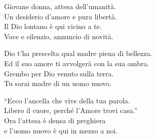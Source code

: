 
\strofa Giovane donna, attesa dell'umanità.\\
Un desiderio d'amore e pura libertà.\\
Il Dio lontano è qui vicino a te.\\
Voce e silenzio, annuncio di novità.

\spazio


\spazio

\strofa Dio t'ha prescelta qual madre piena di bellezza.\\
Ed il suo amore ti avvolgerà con la sua ombra.\\
Grembo per Dio venuto sulla terra.\\
Tu sarai madre di un uomo nuovo.

\spazio


\spazio

\strofa ``Ecco l'ancella che vive della tua parola.\\
Libero il cuore, perché l'Amore trovi casa.''\\
Ora l'attesa è densa di preghiera\\
e l'uomo nuovo è qui in mezzo a noi.

\spazio

